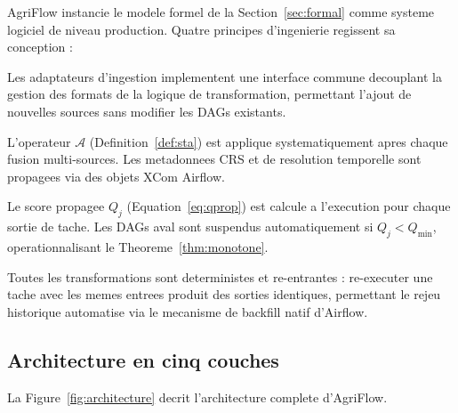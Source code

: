\documentclass[12pt,a4paper]{article}
\theoremstyle{plain}
\theoremstyle{definition}
\theoremstyle{remark}
\begin{document}
AgriFlow instancie le modele formel de la Section~\ref{sec:formal}
comme systeme logiciel de niveau production. Quatre principes
d'ingenierie regissent sa conception :

\begin{description}[leftmargin=1.5em,style=nextline]
  \item[Agnosticisme aux sources.]
    Les adaptateurs d'ingestion implementent une interface commune
    decouplant la gestion des formats de la logique de transformation,
    permettant l'ajout de nouvelles sources sans modifier les DAGs existants.
  \item[Alignement spatio-temporel premier.]
    L'operateur $\mathcal{A}$ (Definition~\ref{def:sta}) est applique
    systematiquement apres chaque fusion multi-sources. Les metadonnees
    CRS et de resolution temporelle sont propagees via des objets XCom Airflow.
  \item[Execution guidee par la qualite.]
    Le score propagee $Q_j$ (Equation~\ref{eq:qprop}) est calcule a
    l'execution pour chaque sortie de tache. Les DAGs aval sont suspendus
    automatiquement si $Q_j < Q_{\min}$, operationnalisant le
    Theoreme~\ref{thm:monotone}.
  \item[Idempotence et backfill.]
    Toutes les transformations sont deterministes et re-entrantes :
    re-executer une tache avec les memes entrees produit des sorties
    identiques, permettant le rejeu historique automatise via
    le mecanisme de backfill natif d'Airflow.
\end{description}

\subsection{Architecture en cinq couches}

La Figure~\ref{fig:architecture} decrit l'architecture complete d'AgriFlow.
\end{document}
